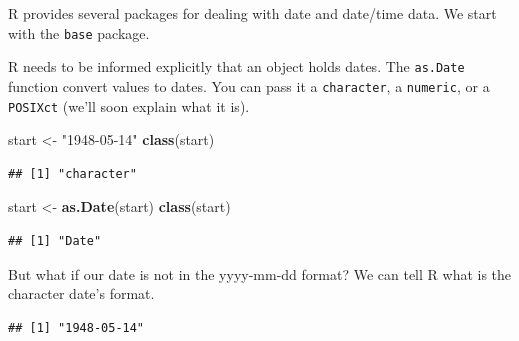\documentclass[]{book}
\newenvironment{Shaded}{\begin{snugshade}}{\end{snugshade}}
\newcommand{\KeywordTok}[1]{\textcolor[rgb]{0.13,0.29,0.53}{\textbf{#1}}}
\newcommand{\DataTypeTok}[1]{\textcolor[rgb]{0.13,0.29,0.53}{#1}}
\newcommand{\StringTok}[1]{\textcolor[rgb]{0.31,0.60,0.02}{#1}}
\newcommand{\NormalTok}[1]{#1}
\theoremstyle{definition}
\theoremstyle{definition}
\theoremstyle{definition}
\theoremstyle{remark}
\begin{document}
R provides several packages for dealing with date and date/time data. We
start with the \texttt{base} package.

R needs to be informed explicitly that an object holds dates. The
\texttt{as.Date} function convert values to dates. You can pass it a
\texttt{character}, a \texttt{numeric}, or a \texttt{POSIXct} (we'll
soon explain what it is).

\begin{Shaded}
\begin{Highlighting}[]
\NormalTok{start <-}\StringTok{ "1948-05-14"}
\KeywordTok{class}\NormalTok{(start)}
\end{Highlighting}
\end{Shaded}

\begin{verbatim}
## [1] "character"
\end{verbatim}

\begin{Shaded}
\begin{Highlighting}[]
\NormalTok{start <-}\StringTok{ }\KeywordTok{as.Date}\NormalTok{(start)}
\KeywordTok{class}\NormalTok{(start)}
\end{Highlighting}
\end{Shaded}

\begin{verbatim}
## [1] "Date"
\end{verbatim}

But what if our date is not in the yyyy-mm-dd format? We can tell R what
is the character date's format.

\begin{Shaded}
\end{Shaded}

\begin{verbatim}
## [1] "1948-05-14"
\end{verbatim}

\begin{Shaded}
\end{Shaded}
\end{document}
